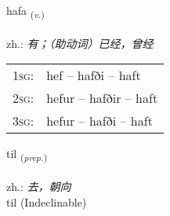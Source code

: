 \documentclass[frontgrid, backgrid]{flacards}\usepackage[]{graphicx}\usepackage[]{xcolor}
\begin{document}
\renewcommand{\blhead}{\vskip5pt {\small\bfseries\footnotesize Sagnorð | 动词 }}
\renewcommand{\bcfoot}{\vskip5pt \hspace{2pt}{\small\bfseries\footnotesize 1K}}


{hafa \small{\textsubscript{(\textit{v.})}} \\[1ex] %
\textphonetic{[haːva]} \\
zh.: \emph{有；（助动词）已经，曾经} \\  [2ex]
\renewcommand*{\arraystretch}{0.8}
\begin{tabular}{p{1cm}l}
\textsc{1sg}: & hef -- hafði -- haft \\ 
\textsc{2sg}: & hefur -- hafðir -- haft \\ 
\textsc{3sg}: & hefur -- hafði -- haft \\ 
\end{tabular}
}


\renewcommand{\flhead}{\vskip5pt \fboxsep=0pt {\small\bfseries\footnotesize Forsetning | 介词}}
\renewcommand{\fcfoot}{\vskip5pt \fboxsep=0pt \hspace{2pt}{\small\bfseries\footnotesize 1K}}

\renewcommand{\blhead}{\vskip5pt {\small\bfseries\footnotesize Forsetning | 介词 }}
\renewcommand{\bcfoot}{\vskip5pt \hspace{2pt}{\small\bfseries\footnotesize 1K}}


{til \small{\textsubscript{(\textit{prep.})}} \\[1ex]
\textphonetic{[tʰɪːl]} \\
zh.: \emph{去，朝向} \\  [2ex]
til (Indeclinable)}

\renewcommand{\flhead}{\vskip5pt \fboxsep=0pt {\small\bfseries\footnotesize Fornafn | 代词}}
\renewcommand{\fcfoot}{\vskip5pt \fboxsep=0pt \hspace{2pt}{\small\bfseries\footnotesize 1K}}

\renewcommand{\blhead}{\vskip5pt {\small\bfseries\footnotesize Fornafn | 代词 }}
\renewcommand{\bcfoot}{\vskip5pt \hspace{2pt}{\small\bfseries\footnotesize 1K}}
\end{document}
